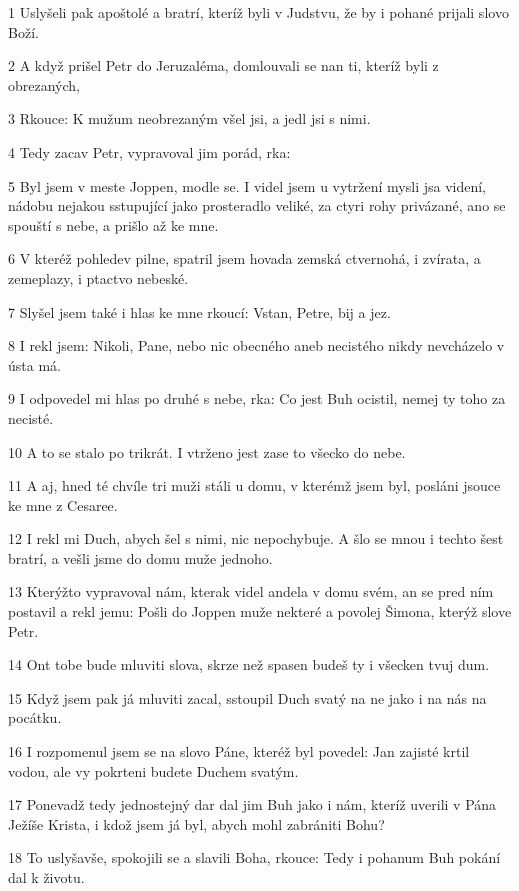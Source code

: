 \par 1 Uslyšeli pak apoštolé a bratrí, kteríž byli v Judstvu, že by i pohané prijali slovo Boží.
\par 2 A když prišel Petr do Jeruzaléma, domlouvali se nan ti, kteríž byli z obrezaných,
\par 3 Rkouce: K mužum neobrezaným všel jsi, a jedl jsi s nimi.
\par 4 Tedy zacav Petr, vypravoval jim porád, rka:
\par 5 Byl jsem v meste Joppen, modle se. I videl jsem u vytržení mysli jsa videní, nádobu nejakou sstupující jako prosteradlo veliké, za ctyri rohy privázané, ano se spouští s nebe, a prišlo až ke mne.
\par 6 V kteréž pohledev pilne, spatril jsem hovada zemská ctvernohá, i zvírata, a zemeplazy, i ptactvo nebeské.
\par 7 Slyšel jsem také i hlas ke mne rkoucí: Vstan, Petre, bij a jez.
\par 8 I rekl jsem: Nikoli, Pane, nebo nic obecného aneb necistého nikdy nevcházelo v ústa má.
\par 9 I odpovedel mi hlas po druhé s nebe, rka: Co jest Buh ocistil, nemej ty toho za necisté.
\par 10 A to se stalo po trikrát. I vtrženo jest zase to všecko do nebe.
\par 11 A aj, hned té chvíle tri muži stáli u domu, v kterémž jsem byl, posláni jsouce ke mne z Cesaree.
\par 12 I rekl mi Duch, abych šel s nimi, nic nepochybuje. A šlo se mnou i techto šest bratrí, a vešli jsme do domu muže jednoho.
\par 13 Kterýžto vypravoval nám, kterak videl andela v domu svém, an se pred ním postavil a rekl jemu: Pošli do Joppen muže nekteré a povolej Šimona, kterýž slove Petr.
\par 14 Ont tobe bude mluviti slova, skrze než spasen budeš ty i všecken tvuj dum.
\par 15 Když jsem pak já mluviti zacal, sstoupil Duch svatý na ne jako i na nás na pocátku.
\par 16 I rozpomenul jsem se na slovo Páne, kteréž byl povedel: Jan zajisté krtil vodou, ale vy pokrteni budete Duchem svatým.
\par 17 Ponevadž tedy jednostejný dar dal jim Buh jako i nám, kteríž uverili v Pána Ježíše Krista, i kdož jsem já byl, abych mohl zabrániti Bohu?
\par 18 To uslyšavše, spokojili se a slavili Boha, rkouce: Tedy i pohanum Buh pokání dal k životu.
